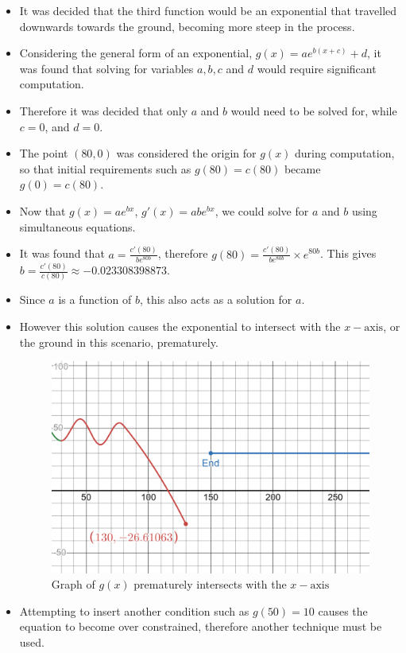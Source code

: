 \documentclass[11pt, letterpaper]{article}
\begin{document}
\begin{itemize}
	\item It was decided that the third function would be an exponential that travelled downwards towards the ground, becoming more steep in the process. 
	\item Considering the general form of an exponential, $g(x)=ae^{b(x+c)}+d$, it was found that solving for variables $a, b, c$ and $d$ would require significant computation.
	\item Therefore it was decided that only $a$ and $b$ would need to be solved for, while $c=0$, and $d=0$.
	\item The point $(80, 0)$ was considered the origin for $g(x)$ during computation, so that  initial requirements such as $g(80)=c(80)$ became $g(0)=c(80)$. 
	\item Now that $g(x)=ae^{bx}$, $g'(x)=abe^{bx}$, we could solve for $a$ and $b$ using simultaneous equations.
	\item It was found that $a=\frac{c'(80)}{be^{80b}}$, therefore $g(80)=\frac{c'(80)}{be^{80b}}\times e^{80b}$. This gives $b=\frac{c'(80)}{c(80)}\approx -0.023308398873$.
	\item Since $a$ is a function of $b$, this also acts as a solution for $a$.
	\item However this solution causes the exponential to intersect with the $x-\textrm{axis}$, or the ground in this scenario, prematurely. 
	\begin{figure}[h]
		\centering
		\includegraphics[width=15cm]{PrematureIntersecion.png}
		\caption{Graph of $g(x)$ prematurely intersects with the $x-\textrm{axis}$}
	\end{figure}
	\item Attempting to insert another condition such as $g(50)=10$ causes the equation to become over constrained, therefore another technique must be used. 
	

\end{itemize}
\end{document}
